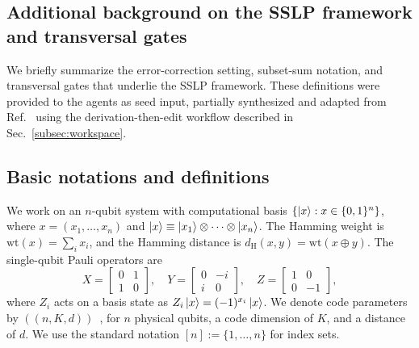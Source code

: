 \documentclass[pdflatex,sn-nature]{sn-jnl}%
\theoremstyle{thmstyleone}%
\theoremstyle{thmstyletwo}%
\theoremstyle{thmstylethree}%
\begin{document}
\begin{appendices}





\section{Additional background on the SSLP framework and transversal gates}
\label{sec:addi}

We briefly summarize the error-correction setting, subset-sum notation, and transversal gates that underlie the SSLP framework. These definitions were provided to the agents as seed input, partially synthesized and adapted from Ref.~\cite{Zhang2025Transversal} using the derivation-then-edit workflow described in Sec.~\ref{subsec:workspace}.

\subsection{Basic notations and definitions}
\label{subsec:notation}

We work on an $n$-qubit system with computational basis $\{\ket{x}: x\in\{0,1\}^n\}$, where $x=(x_1,\ldots,x_n)$ and $\ket{x}\equiv\ket{x_1}\otimes\cdots\otimes\ket{x_n}$. The Hamming weight is $\mathrm{wt}(x)=\sum_i x_i$, and the Hamming distance is $d_{\mathrm{H}}(x,y)=\mathrm{wt}(x\oplus y)$. The single-qubit Pauli operators are
\[
    X=\begin{bmatrix}0&1\\1&0\end{bmatrix},\quad
    Y=\begin{bmatrix}0&-i\\i&0\end{bmatrix},\quad
    Z=\begin{bmatrix}1&0\\0&-1\end{bmatrix},
\]
where $Z_i$ acts on a basis state as $Z_i\ket{x}=(-1)^{x_i}\ket{x}$. We denote code parameters by $((n,K,d))$~\cite{Nielsen2010Quantum}, for $n$ physical qubits, a code dimension of $K$, and a distance of $d$. We use the standard notation $[n]:=\{1,\ldots,n\}$ for index sets.


\end{appendices}
\end{document}
